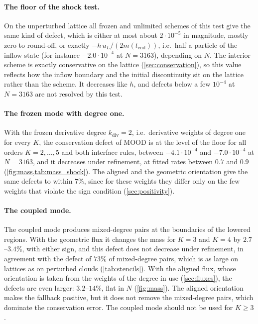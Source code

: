 \documentclass[11pt,a4paper]{article}
\numberwithin{equation}{section}
\begin{document}
\paragraph{The floor of the shock test.} On the unperturbed lattice all frozen and unlimited schemes of this test give the same kind of defect, which is either at most about $2\cdot10^{-5}$ in magnitude, mostly zero to round-off, or exactly $-h\,u_L/(2m(t_{\mathrm{end}}))$, i.e.\ half a particle of the inflow state (for instance $-2.0\cdot10^{-4}$ at $N=3163$), depending on $N$. The interior scheme is exactly conservative on the lattice (\cref{sec:conservation}), so this value reflects how the inflow boundary and the initial discontinuity sit on the lattice rather than the scheme. It decreases like $h$, and defects below a few $10^{-4}$ at $N=3163$ are not resolved by this test.

\paragraph{The frozen mode with degree one.} With the frozen derivative degree $k_{\mathrm{div}}=2$, i.e.\ derivative weights of degree one for every $K$, the conservation defect of MOOD is at the level of the floor for all orders $K=2,\dots,5$ and both interface rules, between $-4.1\cdot10^{-4}$ and $-7.0\cdot10^{-4}$ at $N=3163$, and it decreases under refinement, at fitted rates between $0.7$ and $0.9$ (\cref{fig:mass,tab:mass_shock}). The aligned and the geometric orientation give the same defects to within $7\%$, since for these weights they differ only on the few weights that violate the sign condition (\cref{sec:positivity}).

\paragraph{The coupled mode.} The coupled mode produces mixed-degree pairs at the boundaries of the lowered regions. With the geometric flux it changes the mass for $K=3$ and $K=4$ by $2.7$--$3.4\%$, with either sign, and this defect does not decrease under refinement, in agreement with the defect of $73\%$ of mixed-degree pairs, which is as large on lattices as on perturbed clouds (\cref{tab:stencils}). With the aligned flux, whose orientation is taken from the weights of the degree in use (\cref{sec:fluxes}), the defects are even larger: $3.2$--$14\%$, flat in $N$ (\cref{fig:mass}). The aligned orientation makes the fallback positive, but it does not remove the mixed-degree pairs, which dominate the conservation error. The coupled mode should not be used for $K\ge3$.
\end{document}
